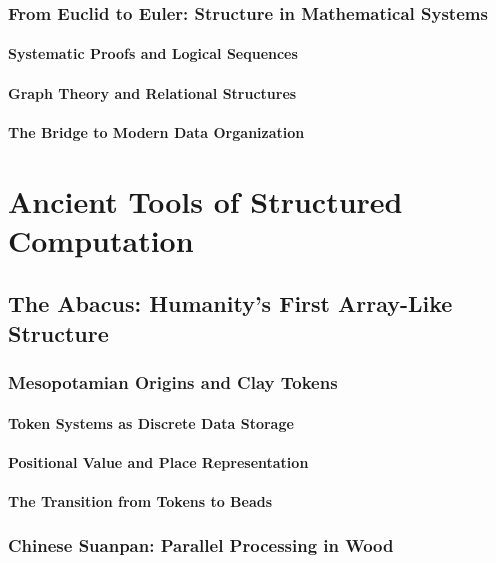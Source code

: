 \documentclass[12pt, oneside]{book}
\begin{document}
\subsection{From Euclid to Euler: Structure in Mathematical Systems}
\subsubsection{Systematic Proofs and Logical Sequences}
\subsubsection{Graph Theory and Relational Structures}
\subsubsection{The Bridge to Modern Data Organization}


\chapter{Ancient Tools of Structured Computation}

\section{The Abacus: Humanity's First Array-Like Structure}
\subsection{Mesopotamian Origins and Clay Tokens}
\subsubsection{Token Systems as Discrete Data Storage}
\subsubsection{Positional Value and Place Representation}
\subsubsection{The Transition from Tokens to Beads}

\subsection{Chinese Suanpan: Parallel Processing in Wood}
\end{document}
